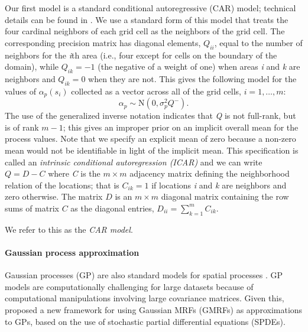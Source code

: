 \documentclass[10pt,letterpaper]{article}
\begin{document}
Our first model is a standard conditional autoregressive (CAR) model;
technical details can be found in \cite{Bane:etal:2004}. We use
a standard form of this model that treats the four
cardinal neighbors of each grid cell as the neighbors of the grid
cell. The corresponding precision matrix has diagonal elements, $Q_{ii}$,
equal to the number of neighbors for the \emph{i}th area (i.e., four except
for cells on the boundary of the domain), while $Q_{ik}=-1$ (the
negative of a weight of one) when areas \emph{i} and \emph{k} are neighbors
and $Q_{ik}=0$ when they are not. This gives the following model
for the values of $\alpha_{p}(s_{i})$ collected as a vector across
all of the grid cells, $i=1,\ldots,m$: 
\[
\alpha_{p}\sim\mbox{N}(0,\sigma_{p}^{2}Q^{-}).
\]
The use of the generalized inverse notation indicates that \emph{Q} is
not full-rank, but is of rank $m-1$; this gives an improper prior
on an implicit overall mean for the process values. Note
that we specify an explicit mean of zero because a non-zero mean would
not be identifiable in light of the implicit mean. This specification
is called an \textit{intrinsic conditional autoregression (ICAR)}
and we can write $Q=D-C$ where \emph{C} is the $m\times m$ adjacency
matrix defining the neighborhood relation of the locations; that is
$C{}_{ik}=1$ if locations \emph{i} and \emph{k} are neighbors and zero otherwise.
The matrix $D$ is an $m\times m$ diagonal matrix containing the
row sums of matrix $C$ as the diagonal entries, $D{}_{ii}={\displaystyle \sum_{k=1}^{m}C{}_{ik}}.$

We refer to this as the \emph{CAR model}.



\paragraph{Gaussian process approximation}

Gaussian processes (GP) are also standard models for spatial processes \cite{Bane:etal:2004}.
GP models are computationally challenging for large datasets because
of computational manipulations involving large covariance
matrices. Given this, \cite{Lind:etal:2011} proposed a new framework
for using Gaussian MRFs (GMRFs) as approximations to GPs, based on
the use of stochastic partial differential equations (SPDEs).
\end{document}
